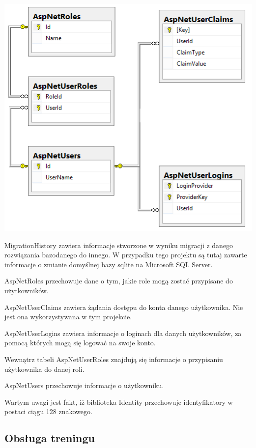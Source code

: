 \newpage
\begin{center}
\includegraphics{images/identity.png}
\end{center}


\textunderscore\textunderscore MigrationHistory zawiera informacje stworzone w wyniku migracji z danego rozwiązania bazodanego do innego. W przypadku tego projektu są tutaj zawarte informacje o zmianie domyślnej bazy sqlite na Microsoft SQL Server.

AspNetRoles przechowuje dane o tym, jakie role mogą zostać przypisane do użytkowników.

AspNetUserClaims zawiera żądania dostępu do konta danego użytkownika. Nie jest ona wykorzystywana w tym projekcie.

AspNetUserLogins zawiera informacje o loginach dla danych użytkowników, za pomocą których mogą się logować na swoje konto.

Wewnątrz tabeli AspNetUserRoles znajdują się informacje o przypisaniu użytkownika do danej roli.

AspNetUsers przechowuje informacje o użytkowniku.

\vspace{5mm}

Wartym uwagi jest fakt, iż biblioteka Identity przechowuje identyfikatory w postaci ciągu 128 znakowego.
 
\subsection{Obsługa treningu}

